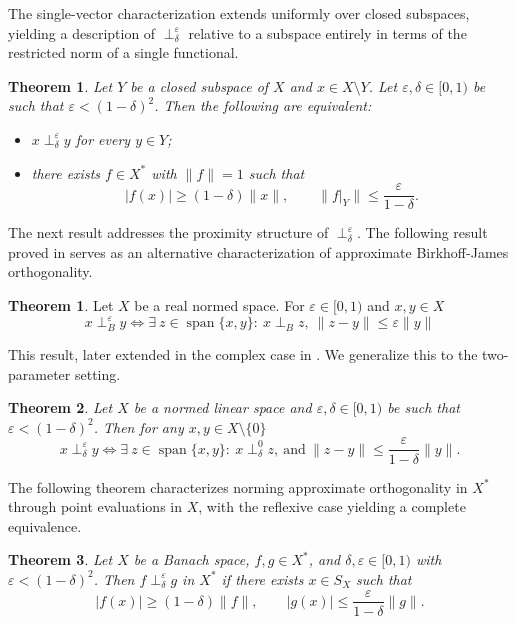 \documentclass[11pt, reqno]{amsart}
\newtheorem{theorem}{Theorem}[section]
\theoremstyle{definition}
\newtheorem*{theorem*}{Theorem}
\newcommand{\nperp}{\perp_{\delta}^\varepsilon}
\begin{document}
\noindent The single-vector characterization extends uniformly over closed subspaces, 
yielding a description of $\nperp$ relative to a subspace entirely in terms of 
the restricted norm of a single functional.

\begin{theorem}\label{thm:subspace}
Let $Y$ be a closed subspace of $X$ and $x \in X \setminus Y$. Let $\varepsilon, \delta \in [0,1)$ be such that $\varepsilon < (1-\delta)^2$. Then 
the following are equivalent:
\begin{itemize}
    \item[(a)] $x \nperp y$ 
for every $y \in Y$;
    \item[(b)]  there exists $f \in X^*$ with $\|f\| = 1$ such that
\[
|f(x)| \geq (1-\delta)\|x\|, \qquad \|f|_Y\| \leq \frac{\varepsilon}{1-\delta}.
\]
\end{itemize}
\end{theorem}


\noindent The next result addresses the proximity structure of $\nperp$. The following result proved in \cite{ChmStWoj} serves as an alternative characterization of approximate Birkhoff-James orthogonality.

\begin{theorem*}\cite[Theorem 2.2]{ChmStWoj}
Let $X$ be a real normed space. For $\varepsilon\in [0,1)$ and $x,y\in X$
\[
x\perp^{\varepsilon}_B y \iff \exists~z\in \operatorname{span}\{x,y\}:~ x\perp_B z,~\|z-y\|\leq \varepsilon\|y\|
\]
\end{theorem*}
\noindent This result, later extended in the complex case in \cite{Woj1}. We generalize this to the two-parameter setting. 



\begin{theorem}\label{thm:Linspace}
Let $X$ be a normed linear space and $\varepsilon, \delta \in [0,1)$ be such that 
$\varepsilon < (1-\delta)^2$. Then for any $x,y\in X\setminus \{0\}$
\[
x\nperp y \iff \exists~z\in \operatorname{span}\{x,y\}:~x\perp_\delta^0 z,~\text{and}~\|z-y\|\leq \frac{\varepsilon}{1-\delta}\|y\|.
\]
\end{theorem}



\medskip


\noindent The following theorem characterizes norming approximate orthogonality in 
$X^*$ through point evaluations in $X$, with the reflexive case yielding a 
complete equivalence.

\begin{theorem}\label{thm:dual}
Let $X$ be a Banach space, $f, g \in X^*$, and $\delta, \varepsilon \in [0,1)$ with 
$\varepsilon < (1-\delta)^2$. Then $f \perp_\delta^\varepsilon g$ in $X^*$ if there 
exists $x \in S_X$ such that
\[
|f(x)| \geq (1-\delta)\|f\|, \qquad |g(x)| \leq \frac{\varepsilon}{1-\delta}\|g\|.
\]
\end{theorem}
\end{document}
